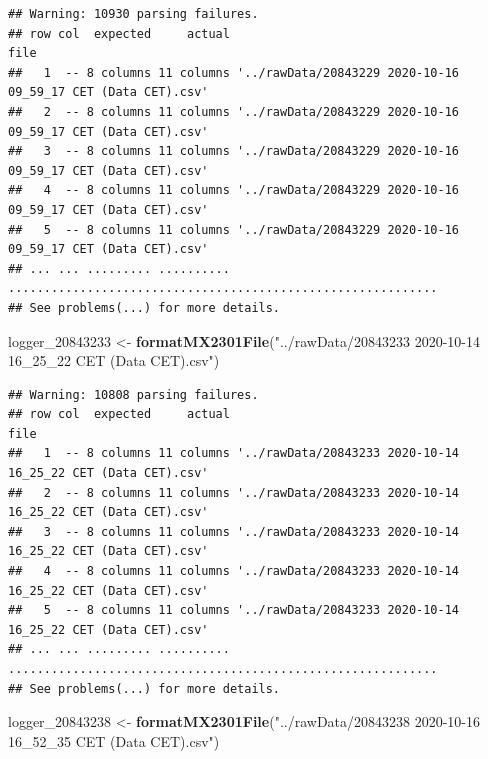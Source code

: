 \documentclass[]{article}
\newenvironment{Shaded}{\begin{snugshade}}{\end{snugshade}}
\newcommand{\DecValTok}[1]{\textcolor[rgb]{0.00,0.00,0.81}{#1}}
\newcommand{\KeywordTok}[1]{\textcolor[rgb]{0.13,0.29,0.53}{\textbf{#1}}}
\newcommand{\NormalTok}[1]{#1}
\newcommand{\StringTok}[1]{\textcolor[rgb]{0.31,0.60,0.02}{#1}}
\begin{document}
\begin{verbatim}
## Warning: 10930 parsing failures.
## row col  expected     actual                                                         file
##   1  -- 8 columns 11 columns '../rawData/20843229 2020-10-16 09_59_17 CET (Data CET).csv'
##   2  -- 8 columns 11 columns '../rawData/20843229 2020-10-16 09_59_17 CET (Data CET).csv'
##   3  -- 8 columns 11 columns '../rawData/20843229 2020-10-16 09_59_17 CET (Data CET).csv'
##   4  -- 8 columns 11 columns '../rawData/20843229 2020-10-16 09_59_17 CET (Data CET).csv'
##   5  -- 8 columns 11 columns '../rawData/20843229 2020-10-16 09_59_17 CET (Data CET).csv'
## ... ... ......... .......... ............................................................
## See problems(...) for more details.
\end{verbatim}

\begin{Shaded}
\begin{Highlighting}[]
\NormalTok{logger_}\DecValTok{20843233}\NormalTok{ <-}\StringTok{ }\KeywordTok{formatMX2301File}\NormalTok{(}\StringTok{"../rawData/20843233 2020-10-14 16_25_22 CET (Data CET).csv"}\NormalTok{)}
\end{Highlighting}
\end{Shaded}

\begin{verbatim}
## Warning: 10808 parsing failures.
## row col  expected     actual                                                         file
##   1  -- 8 columns 11 columns '../rawData/20843233 2020-10-14 16_25_22 CET (Data CET).csv'
##   2  -- 8 columns 11 columns '../rawData/20843233 2020-10-14 16_25_22 CET (Data CET).csv'
##   3  -- 8 columns 11 columns '../rawData/20843233 2020-10-14 16_25_22 CET (Data CET).csv'
##   4  -- 8 columns 11 columns '../rawData/20843233 2020-10-14 16_25_22 CET (Data CET).csv'
##   5  -- 8 columns 11 columns '../rawData/20843233 2020-10-14 16_25_22 CET (Data CET).csv'
## ... ... ......... .......... ............................................................
## See problems(...) for more details.
\end{verbatim}

\begin{Shaded}
\begin{Highlighting}[]
\NormalTok{logger_}\DecValTok{20843238}\NormalTok{ <-}\StringTok{ }\KeywordTok{formatMX2301File}\NormalTok{(}\StringTok{"../rawData/20843238 2020-10-16 16_52_35 CET (Data CET).csv"}\NormalTok{)}
\end{Highlighting}
\end{Shaded}
\end{document}
